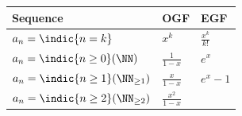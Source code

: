 \begin{longtable}[]{@{}lll@{}}
\toprule
\begin{minipage}[b]{0.30\columnwidth}\raggedright
Sequence\strut
\end{minipage} & \begin{minipage}[b]{0.30\columnwidth}\raggedright
OGF\strut
\end{minipage} & \begin{minipage}[b]{0.30\columnwidth}\raggedright
EGF\strut
\end{minipage}\tabularnewline
\midrule
\endhead
\begin{minipage}[t]{0.30\columnwidth}\raggedright
\(a_n = \indic{n=k}\)\strut
\end{minipage} & \begin{minipage}[t]{0.30\columnwidth}\raggedright
\(x^k\)\strut
\end{minipage} & \begin{minipage}[t]{0.30\columnwidth}\raggedright
\(\frac{x^k}{k!}\)\strut
\end{minipage}\tabularnewline
\begin{minipage}[t]{0.30\columnwidth}\raggedright
\(a_n = \indic{n \geq 0} (\NN)\)\strut
\end{minipage} & \begin{minipage}[t]{0.30\columnwidth}\raggedright
\(\frac 1 {1-x}\)\strut
\end{minipage} & \begin{minipage}[t]{0.30\columnwidth}\raggedright
\(e^x\)\strut
\end{minipage}\tabularnewline
\begin{minipage}[t]{0.30\columnwidth}\raggedright
\(a_n = \indic{n \geq 1} (\NN_{\geq 1})\)\strut
\end{minipage} & \begin{minipage}[t]{0.30\columnwidth}\raggedright
\(\frac x {1-x}\)\strut
\end{minipage} & \begin{minipage}[t]{0.30\columnwidth}\raggedright
\(e^x - 1\)\strut
\end{minipage}\tabularnewline
\begin{minipage}[t]{0.30\columnwidth}\raggedright
\(a_n = \indic{n \geq 2} (\NN_{\geq 2})\)\strut
\end{minipage} & \begin{minipage}[t]{0.30\columnwidth}\raggedright
\(\frac {x^2} {1-x}\)\strut
\end{minipage} & \begin{minipage}[t]{0.30\columnwidth}\raggedright

\end{minipage}
\end{longtable}
